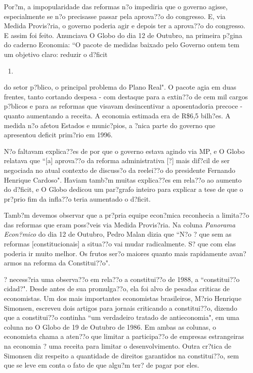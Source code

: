 \documentclass{article}
\begin{document}
Por?m, a impopularidade das reformas n?o impediria que o governo agisse, especialmente se n?o precisasse passar pela aprova??o do congresso. E, via Medida Provis?ria, o governo poderia agir e depois ter a aprova??o do congresso. E assim foi feito. Anunciava O Globo do dia 12 de Outubro, na primeira p?gina do caderno Economia: ``O pacote de medidas baixado pelo Governo ontem tem um objetivo claro: reduzir o d?ficit 
\begin{enumerate}
\item 
\end{enumerate}
do setor p?blico, o principal problema do Plano Real". O pacote agia em duas frentes, tanto cortando despesa - com destaque para a extin??o de cem mil cargos p?blicos e para as reformas que visavam desincentivar a aposentadoria precoce - quanto aumentando a receita. A economia estimada era de R\$6,5 bilh?es. A medida n?o afetou Estados e munic?pios, a ?nica parte do governo que apresentou deficit prim?rio em 1996.

N?o faltavam explica??es de por que o governo estava agindo via MP, e O Globo relatava que ``[a] aprova??o da reforma administrativa [?] mais dif?cil de ser negociada no atual contexto de discuss?o da reelei??o do presidente Fernando Henrique Cardoso". Haviam tamb?m muitas explica??es em rela??o ao aumento do d?ficit, e O Globo dedicou um par?grafo inteiro para explicar a tese de que o pr?prio fim da infla??o teria aumentado o d?ficit.

Tamb?m devemos observar que a pr?pria equipe econ?mica reconhecia a limita??o das reformas que eram poss?veis via Medida Provis?ria. Na coluna \textit{Panorama Econ?mico} do dia 12 de Outubro, Pedro Malan dizia que ``N?o ? que sem as reformas [constitucionais] a situa??o vai mudar radicalmente. S? que com elas poderia ir muito melhor. Os frutos ser?o maiores quanto mais rapidamente avan?armos na reforma da Constitui??o". 

? necess?ria uma observa??o em rela??o a constitui??o de 1988, a ``constitui??o cidad?". Desde antes de sua promulga??o, ela foi alvo de pesadas criticas de economistas. Um dos mais importantes economistas brasileiros, M?rio Henrique Simonsen, escreveu dois artigos para jornais criticando a constitui??o, dizendo que a constitui??o continha ``um verdadeiro tratado de antieconomia", em uma coluna no O Globo de 19 de Outubro de 1986. Em ambas as colunas, o economista chama a aten??o que limitar a participa??o de empresas estrangeiras na economia ? uma receita para limitar o desenvolvimento. Outra cr?tica de Simonsen diz respeito a quantidade de direitos garantidos na constitui??o, sem que se leve em conta o fato de que algu?m ter? de pagar por eles.
\end{document}
